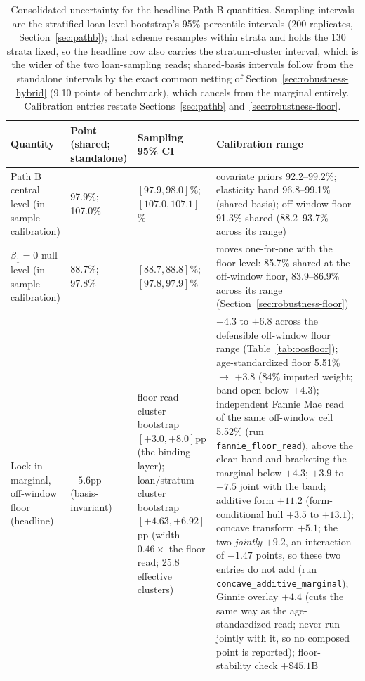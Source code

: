 \documentclass[12pt]{article}
\begin{document}
\begin{table}[H]
\centering
\caption{Consolidated uncertainty for the headline Path B quantities. Sampling intervals are the stratified loan-level bootstrap's 95\% percentile intervals (200 replicates, Section~\ref{sec:pathb}); that scheme resamples within strata and holds the 130 strata fixed, so the headline row also carries the stratum-cluster interval, which is the wider of the two loan-sampling reads; shared-basis intervals follow from the standalone intervals by the exact common netting of Section~\ref{sec:robustness-hybrid} (9.10 points of benchmark), which cancels from the marginal entirely. Calibration entries restate Sections~\ref{sec:pathb} and~\ref{sec:robustness-floor}.}
\label{tab:uncertainty}
\footnotesize
\begin{threeparttable}
\begin{tabular}{@{}p{2.4cm}p{3.3cm}p{4.0cm}p{4.8cm}@{}}
\toprule
Quantity & Point (shared; standalone) & Sampling 95\% CI & Calibration range \\
\midrule
Path B central level (in-sample calibration) & 97.9\%; 107.0\% & $[97.9, 98.0]$\%; $[107.0, 107.1]$\% & covariate priors 92.2--99.2\%; elasticity band 96.8--99.1\% (shared basis); off-window floor 91.3\% shared (88.2--93.7\% across its range) \\
$\beta_1 = 0$ null level (in-sample calibration) & 88.7\%; 97.8\% & $[88.7, 88.8]$\%; $[97.8, 97.9]$\% & moves one-for-one with the floor level: 85.7\% shared at the off-window floor, 83.9--86.9\% across its range (Section~\ref{sec:robustness-floor}) \\
Lock-in marginal, off-window floor (headline) & $+5.6$pp (basis-invariant) & floor-read cluster bootstrap $[+3.0, +8.0]$pp (the binding layer); loan/stratum cluster bootstrap $[+4.63, +6.92]$pp (width $0.46\times$ the floor read; 25.8 effective clusters) & $+4.3$ to $+6.8$ across the defensible off-window floor range (Table~\ref{tab:oosfloor}); age-standardized floor 5.51\% $\to$ $+3.8$ (84\% imputed weight; band open below $+4.3$); independent Fannie Mae read of the same off-window cell 5.52\% (run \texttt{fannie\_floor\_read}), above the clean band and bracketing the marginal below $+4.3$; $+3.9$ to $+7.5$ joint with the band; additive form $+11.2$ (form-conditional hull $+3.5$ to $+13.1$); concave transform $+5.1$; the two \emph{jointly} $+9.2$, an interaction of $-1.47$ points, so these two entries do not add (run \texttt{concave\_additive\_marginal}); Ginnie overlay $+4.4$ (cuts the same way as the age-standardized read; never run jointly with it, so no composed point is reported); floor-stability check $+\$45.1$B \\

\end{tabular}
\end{threeparttable}
\end{table}
\end{document}
